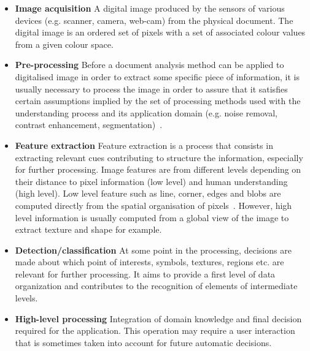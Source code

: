 \begin{itemize}
	\item \textbf{Image acquisition} A digital image produced by the sensors of various devices (e.g. scanner, camera, web-cam) from the physical document.
	The digital image is an ordered set of pixels with a set of associated colour values from a given colour space.
	\item \textbf{Pre-processing} Before a document analysis method can be applied to digitalised image in order to extract some specific piece of information, it is usually necessary to process the image in order to assure that it satisfies certain assumptions implied by the set of processing methods used with the understanding process and its application domain (e.g. noise removal, contrast enhancement, segmentation)~\cite{pal1993review,luccheseyz2001color,bhattacharyya2011brief}.
	\item \textbf{Feature extraction} Feature extraction is a process that consists in extracting relevant cues contributing to structure the information, especially for further processing.
  Image features are from different levels depending on their distance to pixel information (low level) and human understanding (high level).
	Low level feature such as line, corner, edges and blobs are computed directly from the spatial organisation of pixels~\cite{due1996feature}.
	However, high level information is usually computed from a global view of the image to extract texture and shape for example.
	\item \textbf{Detection/classification} At some point in the processing, decisions are made about which point of interests, symbols, textures, regions etc. are relevant for further processing.
  It aims to provide a first level of data organization and contributes to the recognition of elements of intermediate levels.
	\item \textbf{High-level processing} Integration of domain knowledge and final decision required for the application.
	This operation may require a user interaction that is sometimes taken into account for future automatic decisions.
\end{itemize}

